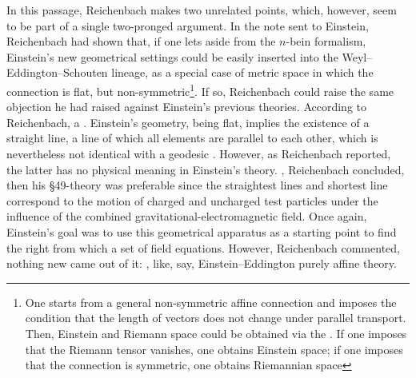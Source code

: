\documentclass[draft]{article}
\newcommand{\manu}[1]{\citep[#1]{Reichenbach1928b}}
\newcommand{\nbein}{$n$-bein\xspace}
\begin{document}
In this passage, Reichenbach makes two unrelated points, which, however, seem to be part of a single two-pronged argument. In the note sent to Einstein, Reichenbach had shown that, if one lets aside from the \nbein formalism, Einstein's new geometrical settings could be easily inserted into the Weyl--Eddington--Schouten lineage, as a special case of metric space in which the connection is flat, but non-symmetric\footnote{One starts from a general non-symmetric affine  connection \Gtmn and imposes the condition that the length of vectors does not change under parallel transport. Then, Einstein and Riemann space could be obtained via the  \manu{5}. If one imposes that the Riemann tensor vanishes, one obtains Einstein space; if one imposes that the connection is symmetric, one obtains Riemannian space}. If so, Reichenbach could raise the same objection he had raised against Einstein's previous theories. According to Reichenbach, a  \manu{7}. Einstein's geometry, being flat, implies the existence of a straight line, a line of which all elements are parallel to each other, which is nevertheless not identical with a geodesic \citep[224]{Einstein19282}. However, as Reichenbach reported, the latter has no physical meaning in Einstein's theory. , Reichenbach concluded, then his \S49-theory was preferable since the straightest lines and shortest line correspond to the motion of charged and uncharged test particles under the influence of the combined gravitational-electromagnetic field. Once again, Einstein's goal was to use this geometrical apparatus as a starting point to find the right  from which a set of field equations. However, Reichenbach commented, nothing new came out of it:  \manu{6}, like, say, Einstein--Eddington purely affine theory. 



\end{document}
